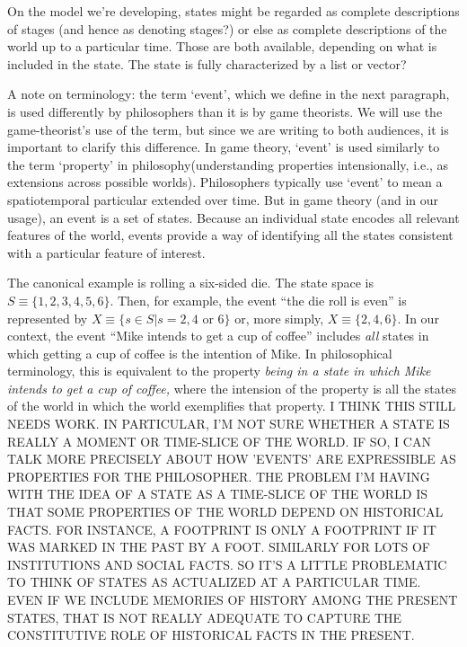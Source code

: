 \documentclass[
11pt,
titlepage,
reqno,
]{article}%
\theoremstyle{definition}
\begin{document}
	On the model we're developing, states might be regarded as complete descriptions of stages (and hence as denoting stages?) or else as complete descriptions of the world up to a particular time. Those are both available, depending on what is included in the state. The state is fully characterized by a list or vector?
	
	A note on terminology: the term `event', which we define in the next paragraph, is used differently by philosophers than it is by game theorists. 
	We will use the game-theorist's use of the term, but since we are writing to both audiences, it is important to clarify this difference. 
	In game theory, `event' is used similarly to the term `property' in philosophy(understanding properties intensionally, i.e., as extensions across possible worlds). 
	Philosophers typically use `event' to mean a spatiotemporal particular extended over time. 
	But in game theory (and in our usage), an event is a set of states. 
	Because an individual state encodes all relevant features of the world, events provide a way of identifying all the states consistent with a particular feature of interest.
	
	The canonical example is rolling a six-sided die. 
	The state space is $S\equiv\{1,2,3,4,5,6\}$. 
	Then, for example, the event ``the die roll is even'' is represented by $X\equiv\{s\in S|s=2,4\text{ or }6\}$ or, more simply, $X\equiv\{2,4,6\}$. 
	In our context, the event ``Mike intends to get a cup of coffee''  includes \textit{all} states in which getting a cup of coffee is the intention of Mike. 
	In philosophical terminology, this is equivalent to the property \textit{being in a state in which Mike intends to get a cup of coffee,} where the intension of the property is all the states of the world in which the world exemplifies that property. 
	I THINK THIS STILL NEEDS WORK. IN PARTICULAR, I'M NOT SURE WHETHER A STATE IS REALLY A MOMENT OR TIME-SLICE OF THE WORLD. IF SO, I CAN TALK MORE PRECISELY ABOUT HOW 'EVENTS' ARE EXPRESSIBLE AS PROPERTIES FOR THE PHILOSOPHER. THE PROBLEM I'M HAVING WITH THE IDEA OF A STATE AS A TIME-SLICE OF THE WORLD IS THAT SOME PROPERTIES OF THE WORLD DEPEND ON HISTORICAL FACTS. FOR INSTANCE, A FOOTPRINT IS ONLY A FOOTPRINT IF IT WAS MARKED IN THE PAST BY A FOOT. SIMILARLY FOR LOTS OF INSTITUTIONS AND SOCIAL FACTS. SO IT'S A LITTLE PROBLEMATIC TO THINK OF STATES AS ACTUALIZED AT A PARTICULAR TIME. EVEN IF WE INCLUDE MEMORIES OF HISTORY AMONG THE PRESENT STATES, THAT IS NOT REALLY ADEQUATE TO CAPTURE THE CONSTITUTIVE ROLE OF HISTORICAL FACTS IN THE PRESENT.
	
\end{document}
